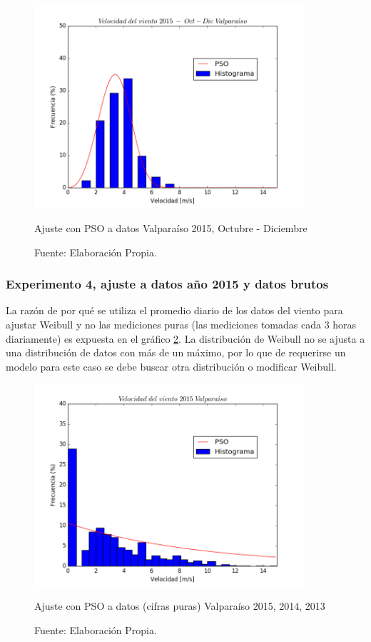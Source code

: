 \begin{figure}[H]
    \centering
    \includegraphics[height=75mm]{figures/result_2015_Oct-Dic.png}
    \caption{Ajuste con PSO a datos Valparaíso 2015, Octubre - Diciembre}
    \vspace{-.25cm}
    \caption*{Fuente: Elaboración Propia.}
    \label{fig:pso_valpo_15_oct_dic}
\end{figure}

\subsubsection{Experimento 4, ajuste a datos año 2015 y datos brutos}
La razón de por qué se utiliza el promedio diario de los datos del viento para ajustar Weibull y no las mediciones puras (las mediciones tomadas cada 3 horas diariamente) es expuesta en el gráfico \ref{fig:pso_valpo_15_all_data}. La distribución de Weibull no se ajusta a una distribución de datos con más de un máximo, por lo que de requerirse un modelo para este caso se debe buscar otra distribución o modificar Weibull.
\begin{figure}[H]
    \centering
    \includegraphics[height=75mm]{figures/result_2015_all_data.png}
    \caption{Ajuste con PSO a datos (cifras puras) Valparaíso 2015, 2014, 2013}
    \vspace{-.25cm}
    \caption*{Fuente: Elaboración Propia.}
    \label{fig:pso_valpo_15_all_data}
\end{figure}

